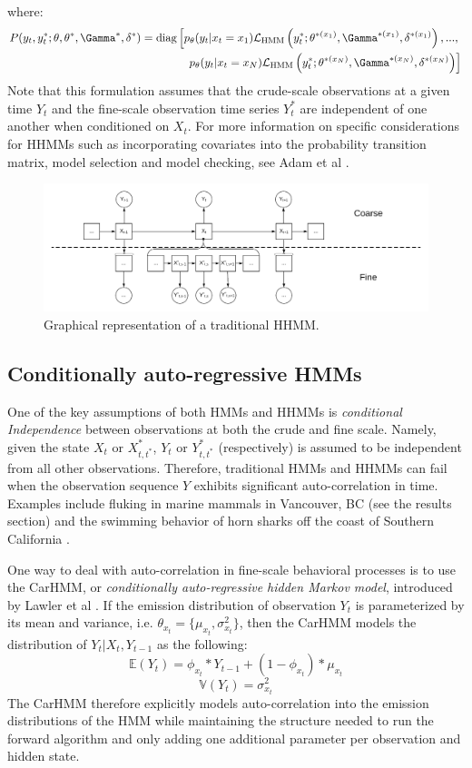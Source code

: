 %
where:
%
\begin{align*}
	P(y_t,y_t^*;\theta,\theta^*,\Gamma^*,\delta^*)  = \text{diag}\left[p_{\theta}(y_t|x_t = x_1)\calL_{\text{HMM}}\left(y_t^*;\theta^{*(x_1)},\Gamma^{*(x_1)},\delta^{*(x_1)}\right), . . . , \right.\\
	\left. p_{\theta}(y_t|x_t = x_N )\calL_{\text{HMM}}\left(y_t^*;\theta^{*(x_N)},\Gamma^{*(x_N)},\delta^{*(x_N)}\right) \right]
\end{align*}
%
Note that this formulation assumes that the crude-scale observations at a given time $Y_t$ and the fine-scale observation time series $Y_t^*$ are independent of one another when conditioned on $X_t$. For more information on specific considerations for HHMMs such as incorporating covariates into the probability transition matrix, model selection and model checking, see Adam et al \cite{Adam:2019}.

\begin{figure}[h!]
	\centering
	\includegraphics[width=6.5in]{../Plots/HHMM.png}
	\caption{Graphical representation of a traditional HHMM.}
	\label{fig:HHMM}
\end{figure}


\subsection{Conditionally auto-regressive HMMs}

One of the key assumptions of both HMMs and HHMMs is \textit{conditional Independence} between observations at both the crude and fine scale. Namely, given the state $X_t$ or $X^*_{t,t^*}$, $Y_t$ or $Y^*_{t,t^*}$ (respectively) is assumed to be independent from all other observations. Therefore, traditional HMMs and HHMMs can fail when the observation sequence $Y$ exhibits significant auto-correlation in time. Examples include fluking in marine mammals in Vancouver, BC (see the results section) and the swimming behavior of horn sharks off the coast of Southern California \cite{Adam:2019}.

One way to deal with auto-correlation in fine-scale behavioral processes is to use the CarHMM, or \textit{conditionally auto-regressive hidden Markov model}, introduced by Lawler et al \cite{Lawler:2019}. If the emission distribution of observation $Y_t$ is parameterized by its mean and variance, i.e. $\theta_{x_t} = \{\mu_{x_t},\sigma^2_{x_t}\}$, then the CarHMM models the distribution of $Y_t|X_t,Y_{t-1}$ as the following:
%
$$\mathbb{E}(Y_t) = \phi_{x_t}*Y_{t-1} + (1-\phi_{x_t}) * \mu_{x_t}$$
$$\mathbb{V}(Y_t) = \sigma^2_{x_t}$$
%
The CarHMM therefore explicitly models auto-correlation into the emission distributions of the HMM while maintaining the structure needed to run the forward algorithm and only adding one additional parameter per observation and hidden state. 

